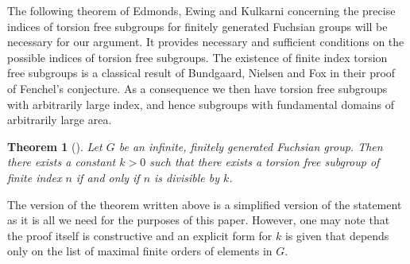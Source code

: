 \documentclass{article}
\numberwithin{equation}{section}
\newtheorem{theorem}[lemma]{Theorem}
\theoremstyle{definition}
\theoremstyle{remark}
\begin{document}
The following theorem of Edmonds, Ewing and Kulkarni concerning the precise indices of torsion free subgroups for finitely generated Fuchsian groups will be necessary for our argument. It provides necessary and sufficient conditions on the possible indices of torsion free subgroups.
The existence of finite index torsion free subgroups is a classical result of Bundgaard, Nielsen \cite{Bungaard_Nielsen_51} and Fox \cite{Fox_torsion_free} in their proof of Fenchel's conjecture.
As a consequence we then have torsion free subgroups with arbitrarily large index, and hence subgroups with fundamental domains of arbitrarily large area. 
\begin{theorem}[\cite{Edmonds1982}]\label{thm:EEK_torsion}
    Let $G$ be an infinite, finitely generated Fuchsian group. Then there exists a constant $k>0$ such that there exists a torsion free subgroup of finite index $n$ if and only if $n$ is divisible by $k$.
\end{theorem}

  The version of the theorem written above is a simplified version of the statement as it is all we need for the purposes of this paper. However, one may note that the proof itself is constructive and an explicit form for $k$ is given that depends only on the list of maximal finite orders of elements in $G$.


   
\end{document}
